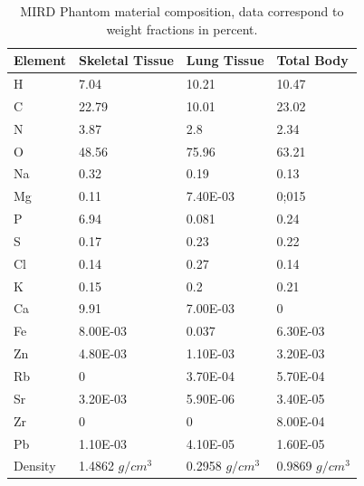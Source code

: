 \documentclass[letterpaper,12pt]{article}
\begin{document}
\begin{table}[H]
\centering
\caption{MIRD Phantom material composition, data correspond to weight fractions in percent.} 
\begin{tabular}{llll}
\hline
\textbf{Element} & \textbf{Skeletal Tissue} & \textbf{Lung Tissue} & \textbf{Total Body} \\ \hline
H                & 7.04                     & 10.21                & 10.47               \\ \hline
C                & 22.79                    & 10.01                & 23.02               \\ \hline
N                & 3.87                     & 2.8                  & 2.34                \\ \hline
O                & 48.56                    & 75.96                & 63.21               \\ \hline
Na               & 0.32                     & 0.19                 & 0.13                \\ \hline
Mg               & 0.11                     & 7.40E-03             & 0;015               \\ \hline
P                & 6.94                     & 0.081                & 0.24                \\ \hline
S                & 0.17                     & 0.23                 & 0.22                \\ \hline
Cl               & 0.14                     & 0.27                 & 0.14                \\ \hline
K                & 0.15                     & 0.2                  & 0.21                \\ \hline
Ca               & 9.91                     & 7.00E-03             & 0                   \\ \hline
Fe               & 8.00E-03                 & 0.037                & 6.30E-03            \\ \hline
Zn               & 4.80E-03                 & 1.10E-03             & 3.20E-03            \\ \hline
Rb               & 0                        & 3.70E-04             & 5.70E-04            \\ \hline
Sr               & 3.20E-03                 & 5.90E-06             & 3.40E-05            \\ \hline
Zr               & 0                        & 0                    & 8.00E-04            \\ \hline
Pb               & 1.10E-03                 & 4.10E-05             & 1.60E-05            \\ \hline
Density          & 1.4862 $g/cm^3$             & 0.2958 $g/cm^3$         & 0.9869 $g/cm^3$        \\ \hline
\end{tabular}
\label{MIRDMatComp}
\end{table}
\end{document}
